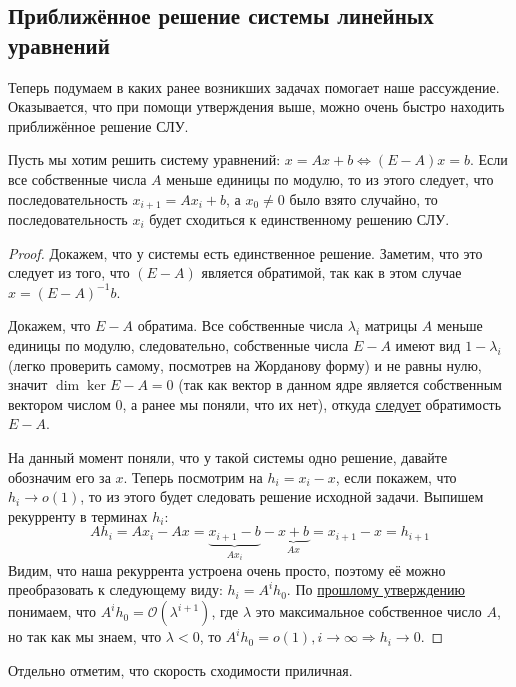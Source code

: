 \subsection{Приближённое решение системы линейных уравнений}
Теперь подумаем в каких ранее возникших задачах помогает наше рассуждение.
Оказывается, что при помощи утверждения выше, можно очень быстро находить приближённое
решение СЛУ.

\begin{statement}
    Пусть мы хотим решить систему уравнений: $x = Ax + b \Leftrightarrow (E - A)x = b$.
    Если все собственные числа $A$ меньше единицы по модулю, то из этого следует, что последовательность
    $x_{i + 1} = Ax_i + b$, а $x_0 \neq 0$ было взято случайно, то последовательность $x_i$ 
    будет сходиться к единственному решению СЛУ.
\end{statement}
\begin{proof}
    Докажем, что у системы есть единственное решение. Заметим, что это следует из того,
    что $(E - A)$ является обратимой, так как в этом случае $x = (E - A)^{-1} b$.

    Докажем, что $E - A$ обратима.
    Все собственные числа $\lambda_i$ матрицы $A$ меньше единицы по модулю, следовательно,
    собственные числа $E - A$ имеют вид $1 - \lambda_i$(легко проверить самому,
    посмотрев на Жорданову форму)
    и не равны нулю, значит $\dim \ker E - A = 0$
    (так как вектор в данном ядре является собственным вектором числом $0$,
    а ранее мы поняли, что их нет), откуда 
    \hyperref[stm:Базовый критерий обратимости]{следует} обратимость $E - A$.

    На данный момент поняли, что у такой системы одно решение, давайте обозначим его за $x$.
    Теперь посмотрим на $h_i = x_i - x$, если покажем, что $h_i \to o(1)$, то из этого
    будет следовать решение исходной задачи. Выпишем рекурренту в терминах $h_i$:
    \[
        A h_i = A x_i - A x = \underbrace{x_{i + 1} - b}_{Ax_i} - \underbrace{x + b}_{Ax} = 
        x_{i + 1} - x = h_{i + 1}
    \] 
    Видим, что наша рекуррента устроена очень просто, поэтому её можно преобразовать
    к следующему виду: $h_i = A^i h_0$. По \hyperref[stm:Ассимптотическая оценка элементов матрицы]
    {прошлому утверждению} понимаем, что $A^i h_0 = \mathcal{O}(\lambda^{i + 1})$, где $\lambda$
    это максимальное собственное число $A$, но так как мы знаем, что $\lambda < 0$,
    то $A^i h_0 = o(1), i \to \infty \Rightarrow h_i \to 0$.
\end{proof}
\begin{remark}
    Отдельно отметим, что скорость сходимости приличная.
\end{remark}

